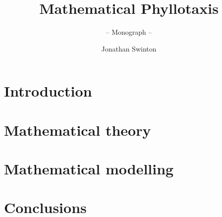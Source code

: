 \documentclass[graybox,envcountchap,sectrefs]{svmono}
\begin{document}
	



\author{Jonathan Swinton}
\title{Mathematical Phyllotaxis}
\subtitle{-- Monograph --}
\maketitle

\frontmatter%


%


%

\tableofcontents

\mainmatter%


\part{Introduction}



\part{Mathematical theory}




\part{Mathematical modelling}





\part{Conclusions}



\backmatter%


\end{document}
